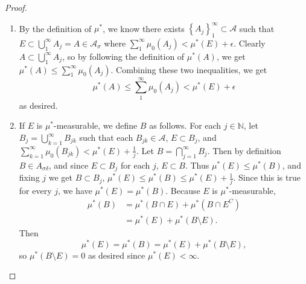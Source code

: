 \documentclass{article}
\theoremstyle{definition}
\begin{document}
\begin{proof}\
	\begin{enumerate}[label=\textbf{\alph*.}]
		\item By the definition of $\mu^*$, we know there exists $\left\lbrace A_j \right\rbrace_1^\infty \subset \mathscr{A}$ such that $E \subset \bigcup_1^\infty A_j = A \in \mathscr{A}_\sigma$ where $\sum_1^\infty \mu_0(A_j) < \mu^*(E) + \epsilon$.
		      Clearly $A \subset \bigcup_1^\infty A_j$, so by following the definition of $\mu^*(A)$, we get $\mu^*(A) \leq \sum_1^\infty \mu_0(A_j)$.
		      Combining these two inequalities, we get \begin{equation*}
			      \mu^*(A) \leq \sum_1^\infty \mu_0(A_j) < \mu^*(E) + \epsilon
		      \end{equation*}
		      as desired.
		\item If $E$ is $\mu^*$-measurable, we define $B$ as follows.
		      For each $j \in \mathbb{N}$, let $B_{j} = \bigcup_{k = 1}^\infty B_{jk}$ such that each $B_{jk} \in \mathscr{A}$, $E \subset B_j$, and $\sum_{k = 1}^\infty \mu_0(B_{jk}) < \mu^*(E) + \frac{1}{j}$.
		      Let $B = \bigcap_{j = 1}^\infty B_j$.
		      Then by definition $B \in A_{\sigma\delta}$, and since $E \subset B_j$ for each $j$, $E \subset B$.
		      Thus $\mu^*(E) \leq \mu^*(B)$, and fixing $j$ we get $B \subset B_j$, $\mu^*(E) \leq \mu^*(B) \leq \mu^*(E) + \frac{1}{j}$.
		      Since this is true for every $j$, we have $\mu^*(E) = \mu^*(B)$.
		      Because $E$ is $\mu^*$-measurable, \begin{align*}
			      \mu^*(B) & = \mu^*(B \cap E) + \mu^*(B \cap E^C) \\
			               & = \mu^*(E) + \mu^*(B \setminus E).
		      \end{align*}
		      Then \begin{equation*}
			      \mu^*(E) = \mu^*(B) = \mu^*(E) + \mu^*(B \setminus E),
		      \end{equation*}
		      so $\mu^*(B \setminus E) = 0$ as desired since $\mu^*(E) < \infty$.


\end{enumerate}
\end{proof}
\end{document}
